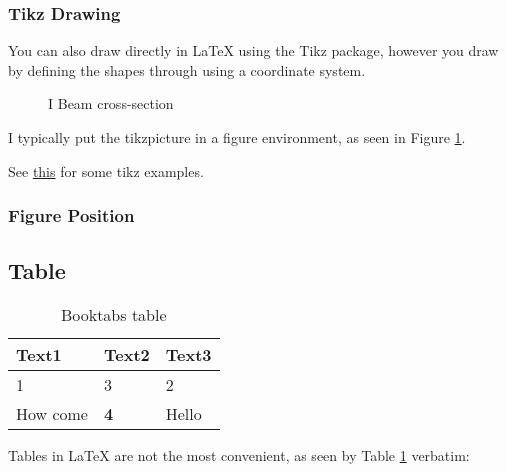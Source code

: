 \documentclass[11pt,a4paper,titlepage]{article}
\begin{document}
\subsubsection{Tikz Drawing}
You can also draw directly in \LaTeX{} using the Tikz package, however you draw by defining the shapes through using a coordinate system.


\begin{figure}[h]
\centering

\caption{I Beam cross-section}
\label{fig:I_beam}
\end{figure}


I typically put the tikzpicture in a figure environment, as seen in Figure \ref{fig:I_beam}.

See \href{http://texample.net/tikz/}{this} for some tikz examples.
\subsubsection{Figure Position}


\subsection{Table}

\begin{table}[h]
\centering
\caption{Booktabs table}
\label{tbl:table1}
\begin{tabular}{@{}lll@{}}
\toprule
Text1    & Text2      & Text3 \\ \midrule
1        & 3          & 2     \\
How come & \textbf{4} & Hello \\ \bottomrule
\end{tabular}
\end{table}


Tables in \LaTeX{} %
are not the most convenient, as seen by Table \ref{tbl:table1} verbatim:
\end{document}
